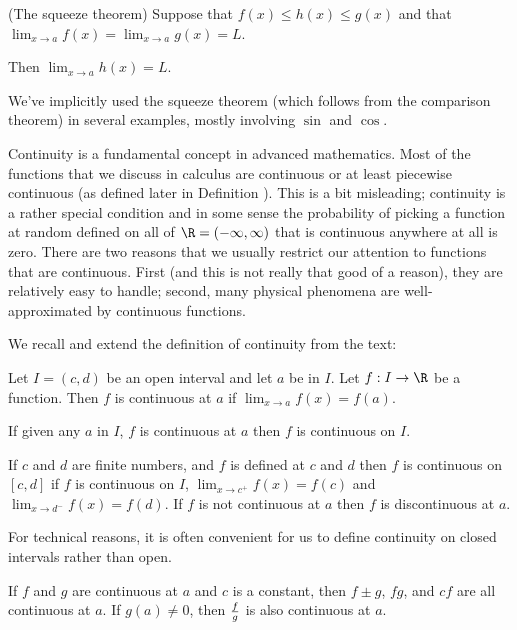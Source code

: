 \begin{example}
\begin{example}
\begin{theorem} (The squeeze theorem) 
Suppose that $f(x) \leq h(x) \leq g(x) $ and that
$\displaystyle{\lim _{x\to a} }f(x) =\displaystyle{\lim _{x\to a} }g(x)=L $.

Then $\displaystyle{\lim _{x\to a} }h(x) =L $.
\label{thm:the squeeze theorem}
\end{theorem}

We've implicitly used the squeeze theorem (which follows from the comparison theorem) in several examples, mostly
 involving $\sin $ and $\cos $.

Continuity is a fundamental concept in advanced mathematics. Most of
the functions that we discuss in calculus are continuous or at least
{\dfont piecewise continuous} (as defined
later in Definition ).
This is a bit misleading; continuity is a rather special
condition and in some sense the probability of picking a function at
random defined on all of $\R=(-\infty, \infty )$ that is
continuous anywhere at all is zero. There are two reasons that we
usually restrict our attention to functions that are continuous. First
(and this is not really that good of a reason), they are relatively
easy to handle; second, many physical phenomena are well-approximated
by continuous functions.

We recall and extend the definition of continuity from the text:

\begin{definition} Let $I=(c,d) $ be an open interval and let $a$ be in $I$. Let
 $f:I \to \R$ be a function.  Then $f$ is continuous
 at $a$ if $\displaystyle{\lim _{x\to a} f(x) }= f(a). $

 If given any $a$ in $I$, $f$ is continuous at $a$ then $f$ is
 continuous on $I$.

 If $c$ and $d$ are finite numbers, and $f$ is defined at $c$ and $d$
  then $f$ is continuous on $[c,d] $ if $f$ is continuous on $I$,
  $\displaystyle{\lim _{x\to c^+ } f(x) }= f(c)$ and
  $\displaystyle{\lim _{x\to d^- } f(x) }= f(d)$. If $f$ is not
  continuous at $a$ then $f$ is {\dfont
  discontinuous} at $a$.
\end{definition} 

For technical reasons, it is often convenient for us to define continuity
on closed intervals rather than open.

\begin{theorem} If $f$ and $g$ are continuous at $a$ and $c$ is a constant,
 then $f\pm g$, $fg$, and $cf $ are all continuous at $a$. If $g(a) \neq 0 $, then
  ${f\over g} $ is also continuous at $a$.
  \end{theorem}


\end{example}
\end{example}
